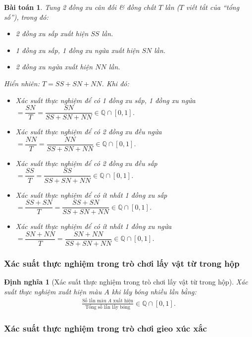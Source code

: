 \documentclass{article}
\numberwithin{equation}{section}
\newtheorem{definition}{Định nghĩa}[section]
\newtheorem{problem}{Bài toán}[section]
\begin{document}
\begin{problem}
	Tung 2 đồng xu cân đối \textit{\&} đồng chất $T$ lần ($T$ viết tắt của ``tổng số''), trong đó:
	\begin{itemize}
		\item 2 đồng xu sấp xuất hiện $SS$ lần.
		\item 1 đồng xu sấp, 1 đồng xu ngửa xuất hiện $SN$ lần.
		\item 2 đồng xu ngửa xuất hiện $NN$ lần.
	\end{itemize}
	Hiển nhiên: $T = SS + SN + NN$. Khi đó:
	\begin{itemize}
		\item Xác suất thực nghiệm để có 1 đồng xu sấp, 1 đồng xu ngửa $= \dfrac{SN}{T} = \dfrac{SN}{SS + SN + NN}\in\mathbb{Q}\cap[0,1]$.
		\item Xác suất thực nghiệm để có 2 đồng xu đều ngửa $= \dfrac{NN}{T} = \dfrac{NN}{SS + SN + NN}\in\mathbb{Q}\cap[0,1]$.
		\item Xác suất thực nghiệm để có 2 đồng xu đều sấp $= \dfrac{SS}{T} = \dfrac{SS}{SS + SN + NN}\in\mathbb{Q}\cap[0,1]$.
		\item Xác suất thực nghiệm để có ít nhất 1 đồng xu sấp $= \dfrac{SS + SN}{T} = \dfrac{SS + SN}{SS + SN + NN}\in\mathbb{Q}\cap[0,1]$.
		\item Xác suất thực nghiệm để có ít nhất 1 đồng xu ngửa $= \dfrac{SN + NN}{T} = \dfrac{SN + NN}{SS + SN + NN}\in\mathbb{Q}\cap[0,1]$.
	\end{itemize}
\end{problem}

\subsubsection{Xác suất thực nghiệm trong trò chơi lấy vật từ trong hộp}

\begin{definition}[Xác suất thực nghiệm trong trò chơi lấy vật từ trong hộp]
	\emph{Xác suất thực nghiệm xuất hiện màu $A$} khi lấy bóng nhiều lần bằng:
	\begin{align*}
		\frac{\mbox{Số lần màu $A$ xuất hiện}}{\mbox{Tổng số lần lấy bóng}}\in\mathbb{Q}\cap[0,1].
	\end{align*}
\end{definition}

\subsubsection{Xác suất thực nghiệm trong trò chơi gieo xúc xắc}
\end{document}
